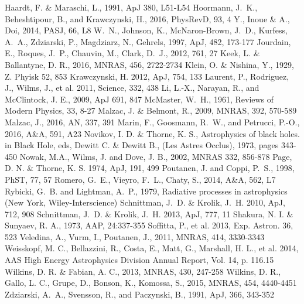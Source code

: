 \documentclass[manuscript]{aastex}
\begin{document}
\begin{thebibliography}{}
 Haardt, F. \& Maraschi, L., 1991, ApJ 380, L51-L54
 Hoormann, J.~K., Beheshtipour, B., and Krawczynski, H., 2016, PhysRevD, 93, 4
 Y., Inoue \& A., Doi, 2014, PASJ, 66, L8
 W.~N., Johnson, K., McNaron-Brown, J.~D., Kurfess, A.~A., Zdziarski, P., Magdziarz, N., Gehrels, 1997, ApJ, 482, 173-177
 Jourdain, E., Roques, J.~P., Chauvin, M., Clark, D.~J., 2012, 761, 27
 Keek, L. \& Ballantyne, D. R., 2016, MNRAS, 456, 2722-2734 
 Klein, O. \& Nishina, Y., 1929, Z. Phyisk 52, 853
 Krawczynski, H. 2012, ApJ, 754, 133
 Laurent, P., Rodriguez, J., Wilms, J., et al. 2011, Science, 332, 438
 Li, L.-X., Narayan, R., and McClintock, J. E., 2009, ApJ 691, 847
 McMaster, W.~H., 1961, Reviews of Modern Physics, 33, 8-27
 Malzac, J. \& Belmont, R., 2009, MNRAS, 392, 570-589
 Malzac, J., 2016, AN, 337, 391
 Marin, F., Goosmann, R.~W., and Petrucci, P.-O., 2016, A\&A, 591, A23
 Novikov, I. D. \& Thorne, K. S., Astrophysics of black holes. in Black Hole, eds, Dewitt  C. \& Dewitt B., (Les Astres Occlus), 1973, pages 343-450
 Nowak, M.A., Wilms, J. and Dove, J. B., 2002, MNRAS 332, 856-878
 Page, D. N. \& Thorne, K. S. 1974, ApJ, 191, 499
 Poutanen, J. and Coppi, P.~S., 1998, PhST, 77, 57 
 Romero, G.~E., Vieyro, F.~L., Chaty, S., 2014, A\&A, 562, L7 
 Rybicki, G.~B. and Lightman, A.~P., 1979, Radiative processes in astrophysics (New York, Wiley-Interscience)
 Schnittman, J.~D. \& Krolik, J.~H. 2010, ApJ, 712, 908 
 Schnittman, J.~D. \& Krolik, J.~H. 2013, ApJ, 777, 11 
 Shakura, N. I. \& Sunyaev, R. A., 1973, AAP, 24:337-355
 Soffitta, P., et al. 2013, Exp. Astron. 36, 523
 Veledina, A., Vurm, I., Poutanen, J., 2011, MNRAS, 414, 3330-3343
 Weisskopf, M. C., Bellazzini, R., Costa, E., Matt, G., Marshall, H. L., et al. 2014, AAS High Energy Astrophysics Division Annual Report, Vol. 14, p. 116.15
Wilkins, D. R. \& Fabian, A. C., 2013, MNRAS, 430, 247-258
Wilkins, D. R., Gallo,  L. C., Grupe, D., Bonson, K., Komossa, S., 2015, MNRAS, 454, 4440-4451
 Zdziarski, A.~A., Svensson, R., and Paczynski, B., 1991, ApJ, 366, 343-352



\end{thebibliography}
\end{document}
